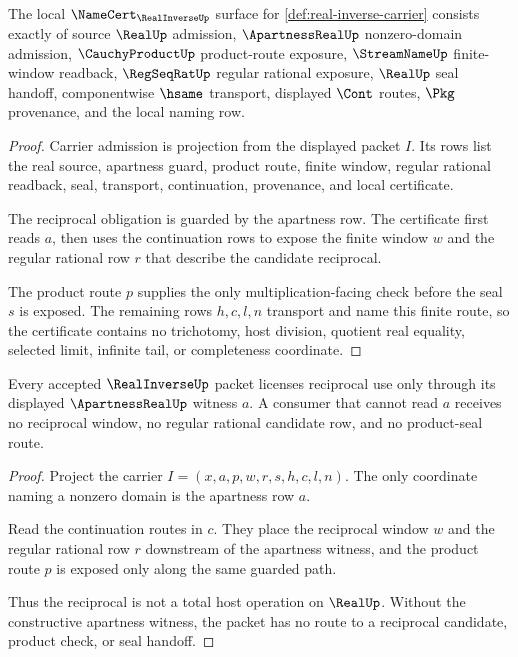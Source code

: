 \begin{theorem}
\label{thm:real-inverse-namecert-obligations}
The local $\NameCert_{\RealInverseUp}$ surface for \autoref{def:real-inverse-carrier} consists exactly of source $\RealUp$ admission, $\ApartnessRealUp$ nonzero-domain admission, $\CauchyProductUp$ product-route exposure, $\StreamNameUp$ finite-window readback, $\RegSeqRatUp$ regular rational exposure, $\RealUp$ seal handoff, componentwise $\hsame$ transport, displayed $\Cont$ routes, $\Pkg$ provenance, and the local naming row.
\end{theorem}
\begin{proof}
Carrier admission is projection from the displayed packet $I$. Its rows list the real source, apartness guard, product route, finite window, regular rational readback, seal, transport, continuation, provenance, and local certificate.

The reciprocal obligation is guarded by the apartness row. The certificate first reads $a$, then uses the continuation rows to expose the finite window $w$ and the regular rational row $r$ that describe the candidate reciprocal.

The product route $p$ supplies the only multiplication-facing check before the seal $s$ is exposed. The remaining rows $h,c,l,n$ transport and name this finite route, so the certificate contains no trichotomy, host division, quotient real equality, selected limit, infinite tail, or completeness coordinate.
\end{proof}

\begin{theorem}
\label{thm:real-inverse-apartness-domain}
Every accepted $\RealInverseUp$ packet licenses reciprocal use only through its displayed $\ApartnessRealUp$ witness $a$. A consumer that cannot read $a$ receives no reciprocal window, no regular rational candidate row, and no product-seal route.
\end{theorem}
\begin{proof}
Project the carrier $I=(x,a,p,w,r,s,h,c,l,n)$. The only coordinate naming a nonzero domain is the apartness row $a$.

Read the continuation routes in $c$. They place the reciprocal window $w$ and the regular rational row $r$ downstream of the apartness witness, and the product route $p$ is exposed only along the same guarded path.

Thus the reciprocal is not a total host operation on $\RealUp$. Without the constructive apartness witness, the packet has no route to a reciprocal candidate, product check, or seal handoff.
\end{proof}

